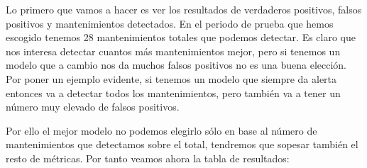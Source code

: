 Lo primero que vamos a hacer es ver los resultados de verdaderos positivos, falsos positivos y mantenimientos detectados. En el periodo de prueba que hemos escogido tenemos 28 mantenimientos totales que podemos detectar. Es claro que nos interesa detectar cuantos más mantenimientos mejor, pero si tenemos un modelo que a cambio nos da muchos falsos positivos no es una buena elección. Por poner un ejemplo evidente, si tenemos un modelo que siempre da alerta entonces va a detectar todos los mantenimientos, pero también va a tener un número muy elevado de falsos positivos.

Por ello el mejor modelo no podemos elegirlo sólo en base al número de mantenimientos que detectamos sobre el total, tendremos que sopesar también el resto de métricas. Por tanto veamos ahora la tabla de resultados:

